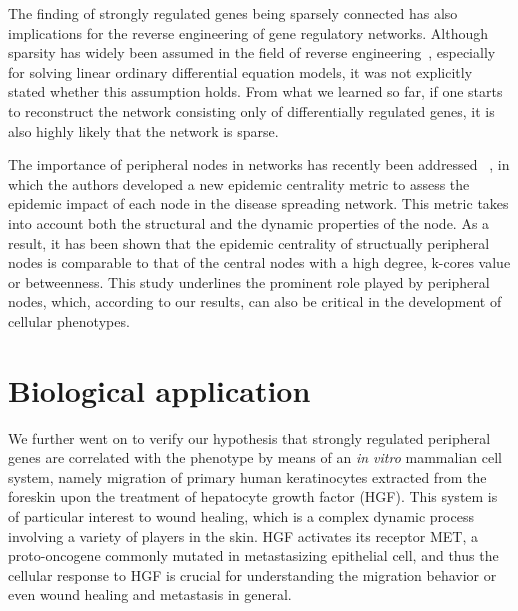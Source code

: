 The finding of strongly regulated genes being sparsely connected
has also implications for the reverse engineering of gene regulatory
networks. Although sparsity has widely been assumed in the field
of reverse engineering~\citep{Yeung2002,Gardner2003}, especially
for solving linear ordinary differential equation models, it was
not explicitly stated whether this assumption holds. From what
we learned so far, if one starts to reconstruct the network consisting only of
differentially regulated genes, it is also highly likely that
the network is sparse.

The importance of peripheral nodes in networks has recently been addressed~%
\citep{Sikic2011}, in which the authors developed a new epidemic centrality
metric to assess the epidemic impact of each node in the disease spreading
network. This metric takes into account both the structural and 
the dynamic properties of the node. As a result,
it has been shown that the epidemic centrality of structually peripheral nodes is 
comparable to that of the central nodes with a high degree, k-cores value or 
betweenness. This study underlines the prominent role played by peripheral
nodes, which, according to our results, can also be critical in the 
development of cellular phenotypes.

\section{Biological application}
We further went on to verify our hypothesis that strongly regulated peripheral 
genes are correlated with the phenotype by means of an \emph{in vitro}
mammalian cell system, namely migration of primary human keratinocytes extracted from the foreskin
upon the treatment of hepatocyte growth factor (HGF). 
This system is of particular interest to wound healing, which is a complex 
dynamic process involving a variety of players in the skin.
HGF activates its receptor MET, a proto-oncogene commonly mutated in 
metastasizing epithelial cell, and thus the cellular response to HGF is 
crucial for understanding the migration behavior or even wound healing and 
metastasis in general. 

